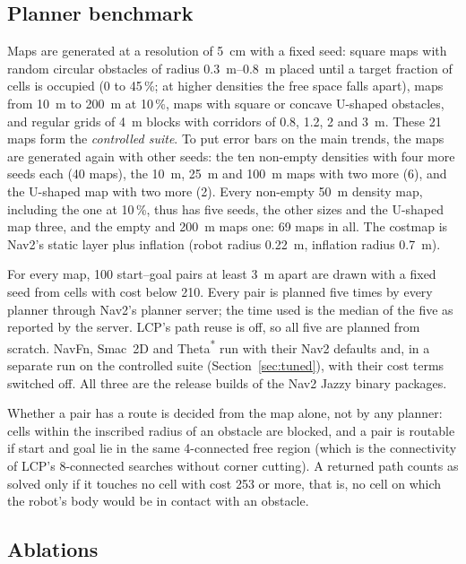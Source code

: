 \documentclass[conference]{IEEEtran}
\newcommand{\lcp}{LCP}
\begin{document}
\subsection{Planner benchmark}
\label{sec:bench}

Maps are generated at a resolution of \SI{5}{cm} with a fixed seed: square maps
with random circular obstacles of radius \SIrange{0.3}{0.8}{m} placed until a
target fraction of cells is occupied (0 to 45\,\%; at higher densities the free
space falls apart), maps from \SI{10}{m} to \SI{200}{m} at 10\,\%, maps with
square or concave U-shaped obstacles, and regular grids of \SI{4}{m} blocks with
corridors of 0.8, 1.2, 2 and \SI{3}{m}. These 21 maps form the \emph{controlled
suite}. To put error bars on the main trends, the maps are generated again with
other seeds: the ten non-empty densities with four more seeds each (40 maps), the
\SI{10}{m}, \SI{25}{m} and \SI{100}{m} maps with two more (6), and the U-shaped
map with two more (2). Every non-empty \SI{50}{m} density map, including the one at 10\,\%, thus has
five seeds, the other sizes and the U-shaped map three, and the empty and \SI{200}{m} maps
one: 69 maps in all. The costmap is Nav2's static layer plus inflation (robot
radius \SI{0.22}{m}, inflation radius \SI{0.7}{m}).

For every map, 100 start--goal pairs at least \SI{3}{m} apart are drawn with a
fixed seed from cells with cost below 210. Every pair is planned five times by
every planner through Nav2's planner server; the time used is the median of the
five as reported by the server. \lcp{}'s path reuse is off, so all five are
planned from scratch. NavFn, Smac~2D and Theta\textsuperscript{*} run with their
Nav2 defaults and, in a separate run on the controlled suite
(Section~\ref{sec:tuned}), with their cost terms switched off. All three are the
release builds of the Nav2 Jazzy binary packages.

Whether a pair has a route is decided from the map alone, not by any planner:
cells within the inscribed radius of an obstacle are blocked, and a pair is
routable if start and goal lie in the same 4-connected free region (which is
the connectivity of \lcp{}'s 8-connected searches without corner cutting). A
returned path counts as solved only if it touches no cell with cost 253 or more,
that is, no cell on which the robot's body would be in contact with an obstacle.

\subsection{Ablations}
\end{document}
